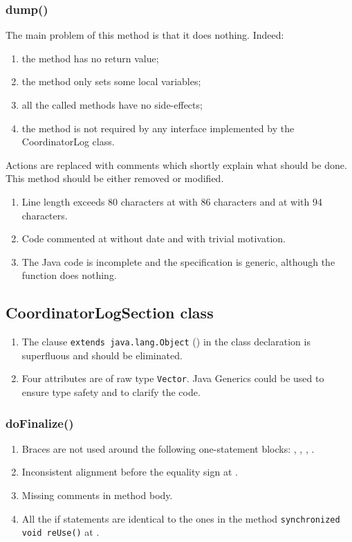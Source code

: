 \subsubsection{dump()}
The main problem of this method is that it does nothing.
Indeed:
\begin{enumerate}
    \item the method has no return value;
    \item the method only sets some local variables;
    \item all the called methods have no side-effects;
    \item the method is not required by any interface implemented by the CoordinatorLog class.
\end{enumerate}
Actions are replaced with comments which shortly explain what should be done.
This method should be either removed or modified.
\begin{enumerate}
	\item {} Line length exceeds 80 characters at  with 86 characters and at  with 94 characters.
	\item {} Code commented at  without date and with trivial motivation.
	\item {} The Java code is incomplete and the specification is generic, although the function does nothing.
\end{enumerate}

\subsection{CoordinatorLogSection class}
\label{sec:coordinatorlogsection-class}

\begin{enumerate}
    \item The clause \texttt{extends java.lang.Object} () in the class declaration is superfluous and should be eliminated.
    \item {} Four attributes are of raw type \texttt{Vector}. Java Generics could be used to ensure type safety and to clarify the code.
\end{enumerate}

\subsubsection{doFinalize()}
\begin{enumerate}
    \item {} Braces are not used around the following one-statement blocks: , , , .
    \item {} Inconsistent alignment before the equality sign at .
    \item {} Missing comments in method body.
    \item {} All the if statements are identical to the ones in the method \texttt{synchronized void reUse()} at .
\end{enumerate}

